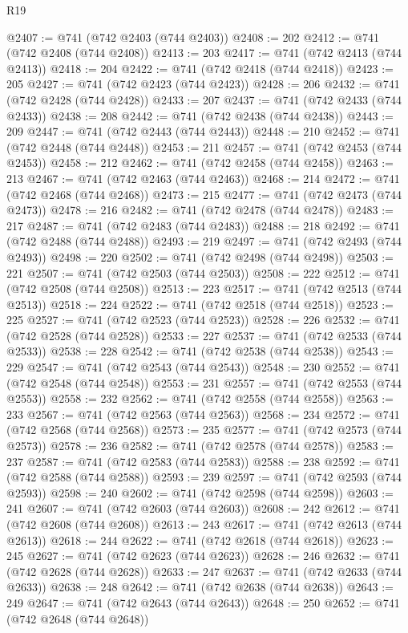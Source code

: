 \begin{lexlean}{R19}
\begin{coremodule}
@2407 := @741 (@742 @2403 (@744 @2403))
@2408 := 202
@2412 := @741 (@742 @2408 (@744 @2408))
@2413 := 203
@2417 := @741 (@742 @2413 (@744 @2413))
@2418 := 204
@2422 := @741 (@742 @2418 (@744 @2418))
@2423 := 205
@2427 := @741 (@742 @2423 (@744 @2423))
@2428 := 206
@2432 := @741 (@742 @2428 (@744 @2428))
@2433 := 207
@2437 := @741 (@742 @2433 (@744 @2433))
@2438 := 208
@2442 := @741 (@742 @2438 (@744 @2438))
@2443 := 209
@2447 := @741 (@742 @2443 (@744 @2443))
@2448 := 210
@2452 := @741 (@742 @2448 (@744 @2448))
@2453 := 211
@2457 := @741 (@742 @2453 (@744 @2453))
@2458 := 212
@2462 := @741 (@742 @2458 (@744 @2458))
@2463 := 213
@2467 := @741 (@742 @2463 (@744 @2463))
@2468 := 214
@2472 := @741 (@742 @2468 (@744 @2468))
@2473 := 215
@2477 := @741 (@742 @2473 (@744 @2473))
@2478 := 216
@2482 := @741 (@742 @2478 (@744 @2478))
@2483 := 217
@2487 := @741 (@742 @2483 (@744 @2483))
@2488 := 218
@2492 := @741 (@742 @2488 (@744 @2488))
@2493 := 219
@2497 := @741 (@742 @2493 (@744 @2493))
@2498 := 220
@2502 := @741 (@742 @2498 (@744 @2498))
@2503 := 221
@2507 := @741 (@742 @2503 (@744 @2503))
@2508 := 222
@2512 := @741 (@742 @2508 (@744 @2508))
@2513 := 223
@2517 := @741 (@742 @2513 (@744 @2513))
@2518 := 224
@2522 := @741 (@742 @2518 (@744 @2518))
@2523 := 225
@2527 := @741 (@742 @2523 (@744 @2523))
@2528 := 226
@2532 := @741 (@742 @2528 (@744 @2528))
@2533 := 227
@2537 := @741 (@742 @2533 (@744 @2533))
@2538 := 228
@2542 := @741 (@742 @2538 (@744 @2538))
@2543 := 229
@2547 := @741 (@742 @2543 (@744 @2543))
@2548 := 230
@2552 := @741 (@742 @2548 (@744 @2548))
@2553 := 231
@2557 := @741 (@742 @2553 (@744 @2553))
@2558 := 232
@2562 := @741 (@742 @2558 (@744 @2558))
@2563 := 233
@2567 := @741 (@742 @2563 (@744 @2563))
@2568 := 234
@2572 := @741 (@742 @2568 (@744 @2568))
@2573 := 235
@2577 := @741 (@742 @2573 (@744 @2573))
@2578 := 236
@2582 := @741 (@742 @2578 (@744 @2578))
@2583 := 237
@2587 := @741 (@742 @2583 (@744 @2583))
@2588 := 238
@2592 := @741 (@742 @2588 (@744 @2588))
@2593 := 239
@2597 := @741 (@742 @2593 (@744 @2593))
@2598 := 240
@2602 := @741 (@742 @2598 (@744 @2598))
@2603 := 241
@2607 := @741 (@742 @2603 (@744 @2603))
@2608 := 242
@2612 := @741 (@742 @2608 (@744 @2608))
@2613 := 243
@2617 := @741 (@742 @2613 (@744 @2613))
@2618 := 244
@2622 := @741 (@742 @2618 (@744 @2618))
@2623 := 245
@2627 := @741 (@742 @2623 (@744 @2623))
@2628 := 246
@2632 := @741 (@742 @2628 (@744 @2628))
@2633 := 247
@2637 := @741 (@742 @2633 (@744 @2633))
@2638 := 248
@2642 := @741 (@742 @2638 (@744 @2638))
@2643 := 249
@2647 := @741 (@742 @2643 (@744 @2643))
@2648 := 250
@2652 := @741 (@742 @2648 (@744 @2648))

\end{coremodule}
\end{lexlean}
